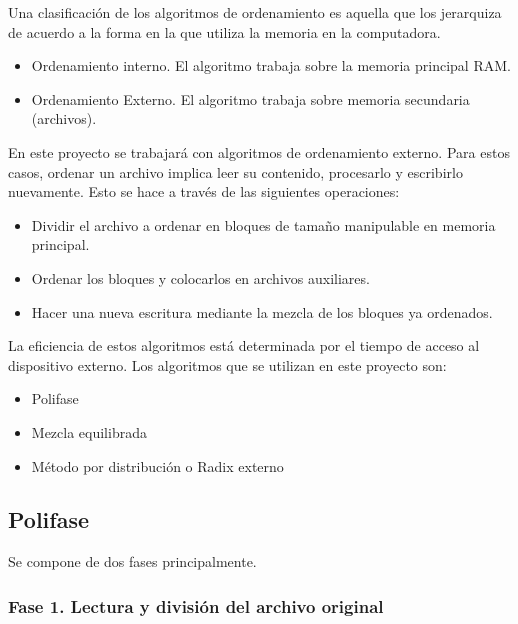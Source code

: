 \documentclass[letter]{report}
\begin{document}
Una clasificación de los algoritmos de ordenamiento es aquella que los jerarquiza de acuerdo a la forma en la que utiliza la memoria en la computadora.

\begin{itemize}
    \item Ordenamiento interno. El algoritmo trabaja sobre la memoria principal RAM.
    \item Ordenamiento Externo. El algoritmo trabaja sobre memoria secundaria (archivos).
\end{itemize}

En este proyecto se trabajará con algoritmos de ordenamiento externo. Para estos casos, ordenar un archivo implica leer su contenido, procesarlo y escribirlo nuevamente. Esto se hace a través de las siguientes operaciones:

\begin{itemize}
    \item Dividir el archivo a ordenar en bloques de tamaño manipulable en memoria principal.
    \item Ordenar los bloques y colocarlos en archivos auxiliares.
    \item Hacer una nueva escritura mediante la mezcla de los bloques ya ordenados.
\end{itemize}

La eficiencia de estos algoritmos está determinada por el tiempo de acceso al dispositivo externo. Los algoritmos que se utilizan en este proyecto son:

\begin{itemize}
    \item Polifase
    \item Mezcla equilibrada
    \item Método por distribución o Radix externo
\end{itemize}

\clearpage
{}
\subsection*{Polifase}

Se compone de dos fases principalmente.

\subsubsection*{Fase 1. Lectura y división del archivo original}
\end{document}
